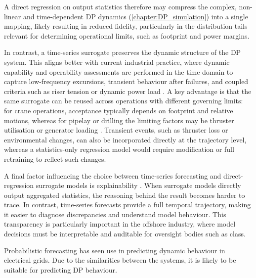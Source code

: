 A direct regression on output statistics therefore may compress the complex, non-linear and time-dependent DP dynamics
(\cref{chapter:DP_simulation}) into a single mapping, likely resulting in reduced fidelity, particularly in the
distribution tails relevant for determining operational limits, such as footprint and power margins.

In contrast, a time-series surrogate preserves the dynamic structure of the DP system. This aligns better with current
industrial practice, where dynamic capability and operability assessments are performed in the time domain to capture
low-frequency excursions, transient behaviour after failures, and coupled criteria such as riser tension or dynamic
power load \parencites{smogeliDynCapFullScale}{tannuriUtilizationNumericalSimulation2011}. A key advantage is that the
same surrogate can be reused across operations with different governing limits: for crane operations, acceptance
typically depends on footprint and relative motions, whereas for pipelay or drilling the limiting factors may be
thruster utilisation or generator loading
\parencites{fruzzettiProbabilisticOperabilityGreenhouse2024}{mauroProbabilisticApproachDynamic2022}. Transient events,
such as thruster loss or environmental changes, can also be incorporated directly at the trajectory level, whereas a
statistics-only regression model would require modification or full retraining to reflect such changes.

A final factor influencing the choice between time-series forecasting and direct-regression surrogate models is
explainability \parencite{kamathExplainabilityTimeSeries2021}. When surrogate models directly output aggregated statistics, the reasoning behind the result becomes
harder to trace. In contrast, time-series forecasts provide a full temporal trajectory, making it easier to diagnose
discrepancies and understand model behaviour. This transparency is particularly important in the offshore industry,
where model decisions must be interpretable and auditable for oversight bodies such as class.

Probabilistic forecasting has seen use in predicting dynamic behaviour in electrical grids. Due to the similarities
between the systems,  it is likely to be suitable for predicting DP behaviour. 


